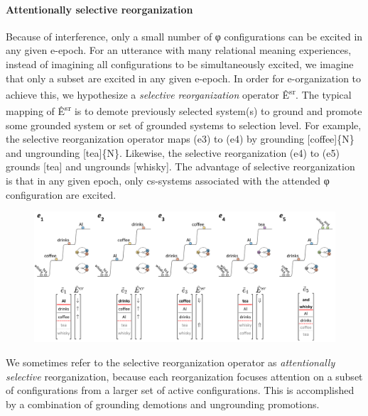 \paragraph{Attentionally selective reorganization}

Because of interference, only a small number of φ configurations can be excited in any given e-epoch. For an utterance with many relational meaning experiences, instead of imagining all configurations to be simultaneously excited, we imagine that only a subset are excited in any given e-epoch. In order for e-organization to achieve this, we hypothesize a \textit{selective} \textit{reorganization} operator Ê\textsuperscript{sr}. The typical mapping of  Ê\textsuperscript{sr} is to demote previously selected system(s) to ground and promote some grounded system or set of grounded systems to selection level. For example, the selective reorganization operator maps (e3) to (e4) by grounding [coffee]\{N\} and ungrounding [tea]\{N\}. Likewise, the selective reorganization (e4) to (e5) grounds [tea] and ungrounds [whisky]. The advantage of selective reorganization is that in any given epoch, only cs-systems associated with the attended φ configuration are excited.

  
\begin{figure}
\includegraphics[width=\textwidth]{figures/Tilsen-img99.png}
\caption{\missingcaption}
\label{fig:}
\end{figure}
   

  We sometimes refer to the selective reorganization operator as \textit{attentionally} \textit{selective} reorganization, because each reorganization focuses attention on a subset of configurations from a larger set of active configurations. This is accomplished by a combination of grounding demotions and ungrounding promotions.

